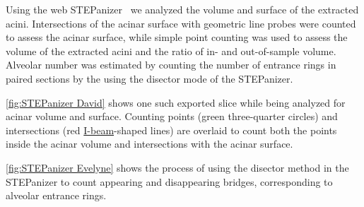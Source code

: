 \documentclass[paper=a4,abstract=true,english,DIV=calc]{scrartcl}
\begin{document}
Using the web STEPanizer~\cite[available free of charge at \url{http://stepanizer.com}]{Tschanz2011} we analyzed the volume and surface of the extracted acini.
Intersections of the acinar surface with geometric line probes were counted to assess the acinar surface, while simple point counting was used to assess the volume of the extracted acini and the ratio of in- and out-of-sample volume. Alveolar number was estimated by counting the number of entrance rings in paired sections by the using the disector mode of the STEPanizer.

\autoref{fig:STEPanizer David} shows one such exported slice while being analyzed for acinar volume and surface. 
Counting points (green three-quarter circles) and intersections (red \href{https://encrypted.google.com/search?q=i-beam&tbm=isch}{I-beam}-shaped lines) are overlaid to count both the points inside the acinar volume and intersections with the acinar surface.

\autoref{fig:STEPanizer Evelyne} shows the process of using the disector method in the STEPanizer to count appearing and disappearing bridges, corresponding to alveolar entrance rings.
\end{document}
